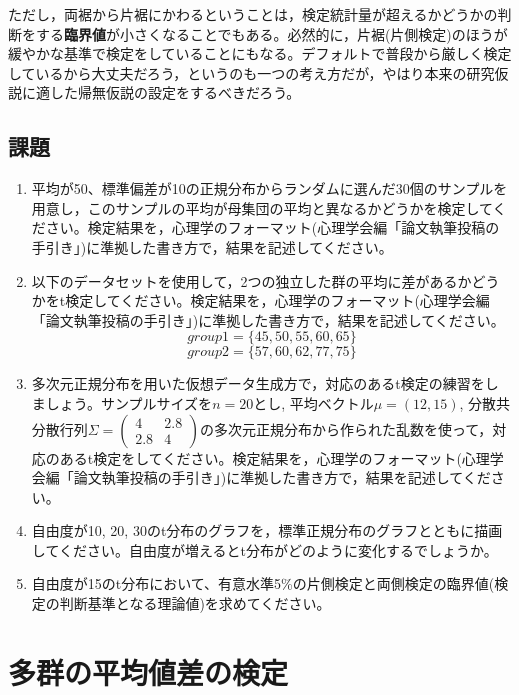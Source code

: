 \documentclass[
  a4paper,
]{ltjsbook}
\begin{document}
ただし，両裾から片裾にかわるということは，検定統計量が超えるかどうかの判断をする\textbf{臨界値}が小さくなることでもある。必然的に，片裾(片側検定)のほうが緩やかな基準で検定をしていることにもなる。デフォルトで普段から厳しく検定しているから大丈夫だろう，というのも一つの考え方だが，やはり本来の研究仮説に適した帰無仮説の設定をするべきだろう。

\section{課題}\label{ux8ab2ux984c-6}

\begin{enumerate}
\def\labelenumi{\arabic{enumi}.}
\item
  平均が50、標準偏差が10の正規分布からランダムに選んだ30個のサンプルを用意し，このサンプルの平均が母集団の平均と異なるかどうかを検定してください。検定結果を，心理学のフォーマット(心理学会編「論文執筆投稿の手引き」)に準拠した書き方で，結果を記述してください。
\item
  以下のデータセットを使用して，2つの独立した群の平均に差があるかどうかをt検定してください。検定結果を，心理学のフォーマット(心理学会編「論文執筆投稿の手引き」)に準拠した書き方で，結果を記述してください。
  \[ group1 =\{45, 50, 55, 60, 65 \} \]
  \[ group2 = \{57, 60, 62, 77, 75 \} \]
\item
  多次元正規分布を用いた仮想データ生成方で，対応のあるt検定の練習をしましょう。サンプルサイズを\(n=20\)とし,
  平均ベクトル\(\mu = (12, 15)\),
  分散共分散行列\(\Sigma = \begin{pmatrix} 4 & 2.8 \\ 2.8 & 4\end{pmatrix}\)の多次元正規分布から作られた乱数を使って，対応のあるt検定をしてください。検定結果を，心理学のフォーマット(心理学会編「論文執筆投稿の手引き」)に準拠した書き方で，結果を記述してください。
\item
  自由度が10, 20,
  30のt分布のグラフを，標準正規分布のグラフとともに描画してください。自由度が増えるとt分布がどのように変化するでしょうか。
\item
  自由度が15のt分布において、有意水準5\%の片側検定と両側検定の臨界値(検定の判断基準となる理論値)を求めてください。
\end{enumerate}


\chapter{多群の平均値差の検定}\label{ux591aux7fa4ux306eux5e73ux5747ux5024ux5deeux306eux691cux5b9a}
\end{document}
